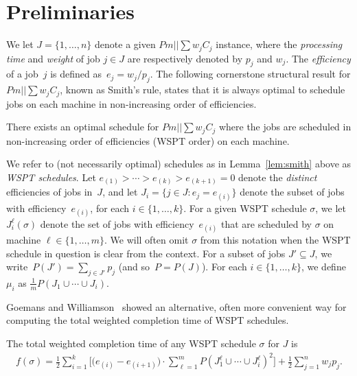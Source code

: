 \documentclass[11pt]{llncs}
\begin{document}
\section{Preliminaries}

We let $J=\{1,\ldots,n\}$ denote a given $Pm||\sum w_j C_j$ instance, where the \emph{processing time} and \emph{weight} of job $j \in J$ are respectively denoted by $p_j$ and $w_j$. The \emph{efficiency} of a job~$j$ is defined as~$e_j = w_j / p_j$. The following cornerstone structural result for $Pm||\sum w_j C_j$, known as Smith's rule, states that it is always optimal to schedule jobs on each machine in non-increasing order of efficiencies.  
\begin{lemma}
\label{lem:smith}
There exists an optimal schedule for $Pm||\sum w_jC_j$ where the jobs are scheduled in non-increasing order of efficiencies (WSPT order) on each machine.
\end{lemma}


We refer to (not necessarily optimal) schedules as in Lemma~\ref{lem:smith} above as \emph{WSPT schedules}. Let $e_{(1)} > \cdots > e_{(k)} > e_{(k+1)} = 0$ denote the \emph{distinct} efficiencies of jobs in~$J$, and let $J_i =\{j \in J: e_j = e_{(i)}\}$ denote the subset of jobs with efficiency~$e_{(i)}$, for each $i \in \{1,\ldots,k\}$. For a given WSPT schedule $\sigma$, we let $J^\ell_i(\sigma)$ denote the set of jobs with efficiency~$e_{(i)}$ that are scheduled by $\sigma$ on machine $\ell \in \{1,\ldots,m\}$. We will often omit $\sigma$ from this notation when the WSPT schedule in question is clear from the context. 
For a subset of jobs $J' \subseteq J$, we write~$P(J')= \sum_{j \in J'} p_j$ (and so~$P=P(J)$). 
For each $i \in \{ 1, \dots, k \}$, we define $\mu_i$ as $\frac{1}{m} P(J_1 \cup \cdots \cup J_i)$.

Goemans and Williamson~\cite{GoemansWillaimson00} showed an alternative, often more convenient way for computing the total weighted completion time of WSPT schedules. 
\begin{lemma} 
\label{lem:GoemansWilliamson}%
The total weighted completion time of any WSPT schedule $\sigma$ for $J$ is
\begin{align*}
f(\sigma) = \frac{1}{2} \sum_{i = 1}^{k}  \Big[ \big(e_{(i)}-e_{(i+1)}\big)  \cdot \sum^m_{\ell=1} P(J^\ell_1 \cup \cdots \cup J^\ell_i)^2 \Big] + \frac{1}{2} \sum^n_{j =1} w_j p_j.
\end{align*}
\end{lemma}
\end{document}
